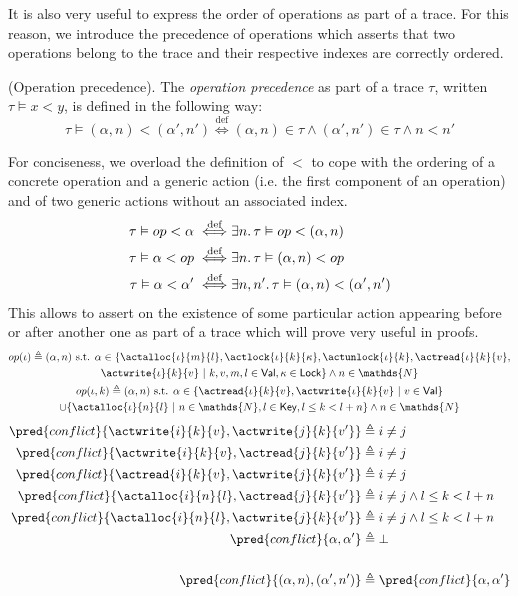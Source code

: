 It is also very useful to express the order of operations as part of a trace. For this reason, we introduce the precedence of operations which asserts that two operations belong to the trace and their respective indexes are correctly ordered.
\begin{defn}
	(Operation precedence).
	The \emph{operation precedence} as part of a trace $\tau$, written $\tau \vDash x < y$, is defined in the following way:
	\[
		\tau \vDash (\alpha, n) < (\alpha', n') \overset{\text{def}}{\iff}
(\alpha, n) \in \tau \land (\alpha', n') \in \tau \land n < n'
	\]
\end{defn}

For conciseness, we overload the definition of $<$ to cope with the ordering of a concrete operation and a generic action (i.e. the first component of an operation) and of two generic actions without an associated index.
\begin{align*}
	\tau \vDash op < \alpha \overset{\text{def}}{\iff}&
	\exists n \ldotp \tau \vDash op < (\alpha, n)
		\\
	\tau \vDash \alpha < op \overset{\text{def}}{\iff}&
	\exists n \ldotp \tau \vDash (\alpha, n) < op
		\\
	\tau \vDash \alpha < \alpha' \overset{\text{def}}{\iff}&
	\exists n, n' \ldotp \tau \vDash (\alpha, n) < (\alpha', n')
\end{align*}
This allows to assert on the existence of some particular action appearing before or after another one as part of a trace which will prove very useful in proofs.
\begin{gather*}
op(\iota) \triangleq (\alpha, n) \text{ s.t. } \alpha \in \{ \actalloc{\iota}{m}{l}, \actlock{\iota}{k}{\kappa}, \actunlock{\iota}{k}, \actread{\iota}{k}{v}, \\ \actwrite{\iota}{k}{v}\ |\ k, v, m, l \in \mathsf{Val}, \kappa \in \mathsf{Lock} \} \land n \in \mathds{N}
\\
op(\iota, k) \triangleq (\alpha, n) \text{ s.t. } \alpha \in \{ \actread{\iota}{k}{v}, \actwrite{\iota}{k}{v}\ |\ v \in \mathsf{Val} \} \\ \cup \{\actalloc{\iota}{n}{l}\ |\ n \in \mathds{N}, l \in \mathsf{Key}, l \leq k < l + n \} \land n \in \mathds{N}
\end{gather*}
\begin{align*}
	\pred{conflict}{\actwrite{i}{k}{v}, \actwrite{j}{k}{v'}} &\triangleq i \neq j
\\
	\pred{conflict}{\actwrite{i}{k}{v}, \actread{j}{k}{v'}} &\triangleq i \neq j
\\
	\pred{conflict}{\actread{i}{k}{v}, \actwrite{j}{k}{v'}} &\triangleq i \neq j
\\
	\pred{conflict}{\actalloc{i}{n}{l}, \actread{j}{k}{v'}} &\triangleq i \neq j \land l \leq k < l + n
\\
	\pred{conflict}{\actalloc{i}{n}{l}, \actwrite{j}{k}{v'}} &\triangleq i \neq j \land l \leq k < l + n
\\
	\pred{conflict}{\alpha, \alpha'} &\triangleq \bot
\\ \\
	\pred{conflict}{(\alpha, n), (\alpha', n')} &\triangleq \pred{conflict}{\alpha, \alpha'}
\end{align*}

